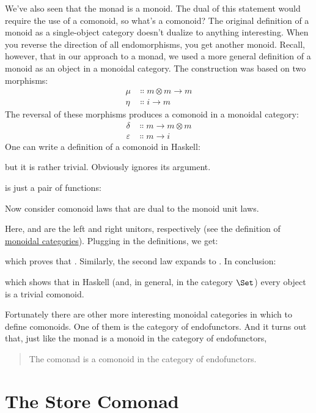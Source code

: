 We've also seen that the monad is a monoid. The dual of this statement
would require the use of a comonoid, so what's a comonoid? The original
definition of a monoid as a single-object category doesn't dualize to
anything interesting. When you reverse the direction of all
endomorphisms, you get another monoid. Recall, however, that in our
approach to a monad, we used a more general definition of a monoid as an
object in a monoidal category. The construction was based on two
morphisms:
\begin{align*}
\mu &\Colon m \otimes m \to m \\
\eta &\Colon i \to m
\end{align*}
The reversal of these morphisms produces a comonoid in a monoidal
category:
\begin{align*}
\delta &\Colon m \to m \otimes m \\
\varepsilon &\Colon m \to i
\end{align*}
One can write a definition of a comonoid in Haskell:

but it is rather trivial. Obviously  ignores its
argument.

 is just a pair of functions:

Now consider comonoid laws that are dual to the monoid unit laws.

Here,  and  are the left and right unitors,
respectively (see the definition of
\hyperref[monads-categorically]{monoidal
categories}). Plugging in the definitions, we get:

which proves that . Similarly, the second law expands
to . In conclusion:

which shows that in Haskell (and, in general, in the category
$\Set$) every object is a trivial comonoid.

Fortunately there are other more interesting monoidal categories in
which to define comonoids. One of them is the category of endofunctors.
And it turns out that, just like the monad is a monoid in the category
of endofunctors,

\begin{quote}
The comonad is a comonoid in the category of endofunctors.
\end{quote}

\section{The Store Comonad}

